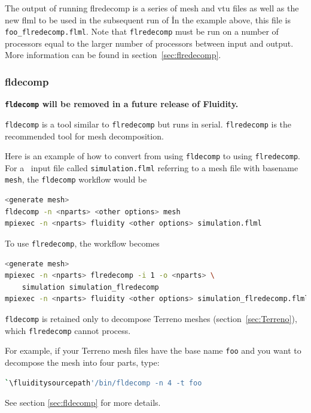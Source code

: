 The output of running flredecomp is a series of mesh and vtu files as well
as the new flml to be used in the subsequent run of \fluidity\.  In the example above, this file is \lstinline+foo_flredecomp.flml+. 
Note that \lstinline[language=bash]+flredecomp+ must be run on a number of processors equal to the larger number of processors between input and output.
More information can be found in section~\ref{sec:flredecomp}.

\subsubsection{fldecomp}
\label{mesh!meshing tools!fldecomp}

{\bf \lstinline[language=bash]+fldecomp+ will be removed in a future release of Fluidity.}

\lstinline[language=bash]+fldecomp+ is a tool similar to \lstinline[language=bash]+flredecomp+ but runs in serial. \lstinline[language=bash]+flredecomp+ is the recommended tool for mesh decomposition.

Here is an example of how to convert from using \lstinline[language=bash]+fldecomp+ to using \lstinline[language=bash]+flredecomp+.  For a \fluidity\ input file called \lstinline[language=bash]+simulation.flml+ referring to a mesh file with basename \lstinline[language=bash]+mesh+, the \lstinline[language=bash]+fldecomp+ workflow would be

\begin{lstlisting}[language=bash]
<generate mesh>
fldecomp -n <nparts> <other options> mesh
mpiexec -n <nparts> fluidity <other options> simulation.flml
\end{lstlisting}

To use \lstinline[language=bash]+flredecomp+, the workflow becomes

\begin{lstlisting}[language=bash]
<generate mesh>
mpiexec -n <nparts> flredecomp -i 1 -o <nparts> \
    simulation simulation_flredecomp
mpiexec -n <nparts> fluidity <other options> simulation_flredecomp.flml
\end{lstlisting}

\lstinline[language=bash]+fldecomp+ is retained only to decompose Terreno meshes (section~\ref{sec:Terreno}), which \lstinline[language=bash]+flredecomp+ cannot process.

For example, if your Terreno mesh files have the base name \lstinline[language=bash]+foo+ and you want to decompose the mesh into four parts, type:
\begin{lstlisting}[language = Bash]
`\fluiditysourcepath'/bin/fldecomp -n 4 -t foo
\end{lstlisting}
See section \ref{sec:fldecomp} for more details.

